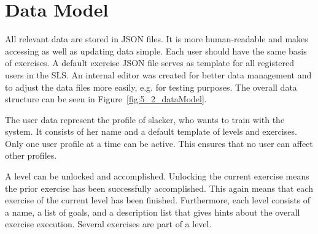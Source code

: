 \section{Data Model}\label{5_2_dataModel}
All relevant data are stored in JSON files. It is more human-readable and makes accessing as well as updating data simple. Each user should have the same basis of exercises. A default exercise JSON file serves as template for all registered users in the SLS. An internal editor was created for better data management and to adjust the data files more easily, e.g. for testing purposes. The overall data structure can be seen in Figure~\ref{fig:5_2_dataModel}.

The user data represent the profile of slacker, who wants to train with the system. It consists of her name and a default template of levels and exercises. Only one user profile at a time can be active. This ensures that no user can affect other profiles.

A level can be unlocked and accomplished. Unlocking the current exercise means the prior exercise has been successfully accomplished. This again means that each exercise of the current level has been finished. Furthermore, each level consists of a name, a list of goals, and a description list that gives hints about the overall exercise execution.
Several exercises are part of a level.

